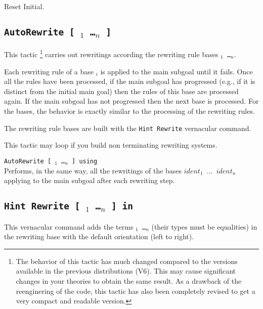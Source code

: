 \begin{coq_eval}
Reset Initial.
\end{coq_eval}

\subsection{\tt AutoRewrite  [ \ident$_1$ \dots \ident$_n$ ]}

This tactic \footnote{The behavior of this tactic has much changed compared to
the versions available in the previous distributions (V6). This may cause
significant changes in your theories to obtain the same result. As a drawback
of the reenginering of the code, this tactic has also been completely revised
to get a very compact and readable version.} carries out rewritings according
the rewriting rule bases {\tt \ident$_1$ \dots \ident$_n$}.

Each rewriting rule of a base \ident$_i$ is applied to the main subgoal until
it fails. Once all the rules have been processed, if the main subgoal has
progressed (e.g., if it is distinct from the initial main goal) then the rules
of this base are processed again. If the main subgoal has not progressed then
the next base is processed. For the bases, the behavior is exactly similar to
the processing of the rewriting rules.

The rewriting rule bases are built with the {\tt Hint~Rewrite} vernacular
command.

\Warning{} This tactic may loop if you build non terminating rewriting systems.

\begin{Variant}
\item {\tt AutoRewrite  [ \ident$_1$ \dots \ident$_n$ ] using \tac}\\
Performs, in the same way, all the rewritings of the bases {\tt $ident_1$ $...$
$ident_n$} applying {\tt \tac} to the main subgoal after each rewriting step.
\end{Variant}

\subsection{\tt Hint Rewrite [ \term$_1$ \dots \term$_n$ ] in \ident}

This vernacular command adds the terms {\tt \term$_1$ \dots \term$_n$} (their
types must be equalities) in the rewriting base {\tt \ident} with the default
orientation (left to right).

